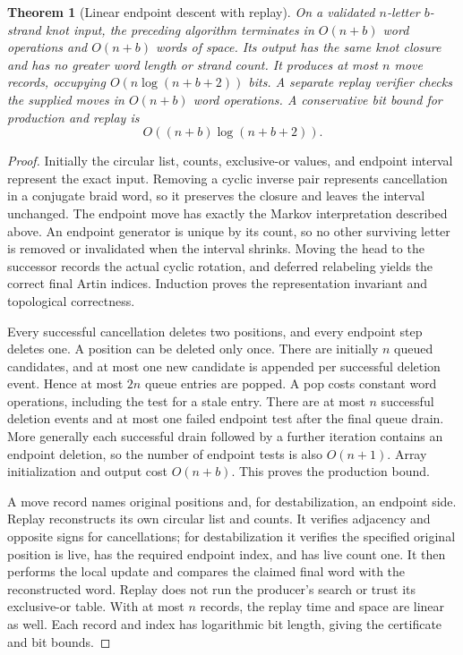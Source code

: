 \documentclass[11pt,letterpaper]{article}
\newtheorem{theorem}{Theorem}[section]
\theoremstyle{definition}
\begin{document}
\begin{theorem}[Linear endpoint descent with replay]
\label{thm:linear}
On a validated $n$-letter $b$-strand knot input, the preceding algorithm terminates in $O(n+b)$ word operations and $O(n+b)$ words of space. Its output has the same knot closure and has no greater word length or strand count. It produces at most $n$ move records, occupying $O(n\log(n+b+2))$ bits. A separate replay verifier checks the supplied moves in $O(n+b)$ word operations. A conservative bit bound for production and replay is
\[
 O((n+b)\log(n+b+2)).
\]
\end{theorem}
\begin{proof}
Initially the circular list, counts, exclusive-or values, and endpoint interval represent the exact input. Removing a cyclic inverse pair represents cancellation in a conjugate braid word, so it preserves the closure and leaves the interval unchanged. The endpoint move has exactly the Markov interpretation described above. An endpoint generator is unique by its count, so no other surviving letter is removed or invalidated when the interval shrinks. Moving the head to the successor records the actual cyclic rotation, and deferred relabeling yields the correct final Artin indices. Induction proves the representation invariant and topological correctness.

Every successful cancellation deletes two positions, and every endpoint step deletes one. A position can be deleted only once. There are initially $n$ queued candidates, and at most one new candidate is appended per successful deletion event. Hence at most $2n$ queue entries are popped. A pop costs constant word operations, including the test for a stale entry. There are at most $n$ successful deletion events and at most one failed endpoint test after the final queue drain. More generally each successful drain followed by a further iteration contains an endpoint deletion, so the number of endpoint tests is also $O(n+1)$. Array initialization and output cost $O(n+b)$. This proves the production bound.

A move record names original positions and, for destabilization, an endpoint side. Replay reconstructs its own circular list and counts. It verifies adjacency and opposite signs for cancellations; for destabilization it verifies the specified original position is live, has the required endpoint index, and has live count one. It then performs the local update and compares the claimed final word with the reconstructed word. Replay does not run the producer's search or trust its exclusive-or table. With at most $n$ records, the replay time and space are linear as well. Each record and index has logarithmic bit length, giving the certificate and bit bounds.
\end{proof}
\end{document}
